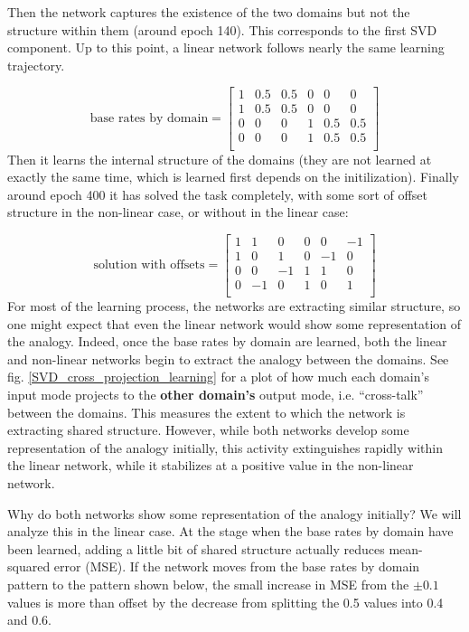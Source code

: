 \documentclass[10pt,letterpaper]{article}
\begin{document}
Then the network captures the existence of the two domains but not the structure within them (around epoch 140). This corresponds to the first SVD component. Up to this point, a linear network follows nearly the same learning trajectory. \par
{ 
\[
\text{base rates by domain} = \left[ \begin{matrix} 
1 & 0.5 & 0.5 & 0 & 0 & 0 \\
1 & 0.5 & 0.5 & 0 & 0 & 0 \\
0 & 0 & 0 & 1 & 0.5 & 0.5  \\
0 & 0 & 0 & 1 & 0.5 & 0.5  \\
\end{matrix}  \right] 
\] 
}
Then it learns the internal structure of the domains (they are not learned at exactly the same time, which is learned first depends on the initilization). Finally around epoch 400 it has solved the task completely, with some sort of offset structure in the non-linear case, or without in the linear case:\par
{ 
\[
\text{solution with offsets} = \left[ \begin{matrix} 
1 & 1 & 0 & 0 & 0 & -1 \\
1 & 0 & 1 & 0 & -1 & 0 \\
 0 & 0 & -1 & 1 & 1 & 0\\
 0 & -1 & 0 & 1 & 0 & 1\\
\end{matrix}  \right] 
\]
}
For most of the learning process, the networks are extracting similar structure, so one might expect that even the linear network would show some representation of the analogy. Indeed, once the base rates by domain are learned, both the linear and non-linear networks begin to extract the analogy between the domains. See fig. \ref{SVD_cross_projection_learning} for a plot of how much each domain's input mode projects to the \textbf{other domain's} output mode, i.e. ``cross-talk'' between the domains. This measures the extent to which the network is extracting shared structure. However, while both networks develop some representation of the analogy initially, this activity extinguishes rapidly within the linear network, while it stabilizes at a positive value in the non-linear network. \par
Why do both networks show some representation of the analogy initially? We will analyze this in the linear case. At the stage when the base rates by domain have been learned, adding a little bit of shared structure actually reduces mean-squared error (MSE). If the network moves from the base rates by domain pattern to the pattern shown below, the small increase in MSE from the \(\pm 0.1\) values is more than offset by the decrease from splitting the 0.5 values into 0.4 and 0.6. \par 
\end{document}
